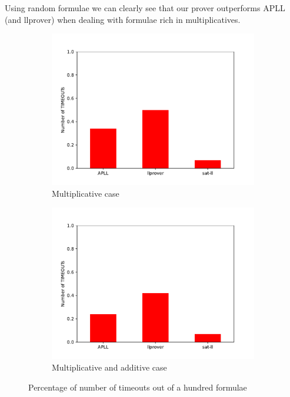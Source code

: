 Using random formulae we can clearly see that our prover outperforms APLL (and llprover) when dealing with formulae rich in multiplicatives.
\begin{figure}[H]
	\centering
	\begin{subfigure}{0.49\textwidth}
		\centering
		\includegraphics[scale=0.5]{./images/mll.pdf}
		\caption{Multiplicative case}
		\label{fig:mll-bars}
	\end{subfigure}
	\begin{subfigure}{0.49\textwidth}
		\centering
		\includegraphics[scale=0.5]{./images/mall.pdf}
		\caption{Multiplicative and additive case}
		\label{fig:mall-bars}
	\end{subfigure}
	\caption{Percentage of number of timeouts out of a hundred formulae}
\end{figure}
